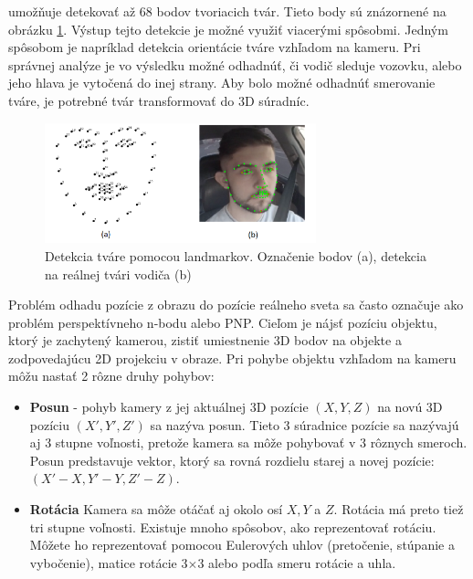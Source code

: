 \documentclass[slovak,master,dept460,male,cpp,cpdeclaration]{diploma}
\begin{document}
 umožňuje detekovať až 68 bodov tvoriacich tvár. Tieto body sú znázornené na obrázku \ref{fig:landmarks}. Výstup tejto detekcie je možné využiť viacerými spôsobmi. Jedným spôsobom je napríklad detekcia orientácie tváre vzhľadom na kameru. Pri správnej analýze je vo výsledku možné odhadnúť, či vodič sleduje vozovku, alebo jeho hlava je vytočená do inej strany. Aby bolo možné odhadnúť smerovanie tváre, je potrebné tvár transformovať do 3D súradníc.

\begin{figure}[H]
	\centering
	\includegraphics[width=0.7\textwidth]{Figures/landmarks.png}
	\caption{Detekcia tváre pomocou landmarkov. Označenie  bodov (a), detekcia na reálnej tvári vodiča (b)}
	\label{fig:landmarks}
\end{figure}


Problém odhadu pozície z obrazu do pozície reálneho sveta sa často označuje ako problém perspektívneho n-bodu alebo PNP. Cieľom je nájsť pozíciu objektu, ktorý je zachytený kamerou, zistiť umiestnenie  3D bodov na objekte a zodpovedajúcu 2D projekciu v obraze. Pri pohybe objektu vzhľadom na kameru môžu nastať 2 rôzne druhy pohybov:
\begin{itemize}
\item\textbf{Posun} - pohyb kamery z jej aktuálnej 3D pozície $(X, Y, Z)$ na novú 3D pozíciu $(X ', Y', Z ')$ sa nazýva posun. Tieto 3 súradnice pozície sa nazývajú aj 3 stupne voľnosti, pretože kamera sa môže pohybovať v 3 rôznych smeroch. Posun predstavuje vektor, ktorý sa rovná rozdielu starej a novej pozície:  $(X '- X, Y' - Y, Z '- Z)$.
\item\textbf{Rotácia}  Kamera sa môže otáčať aj okolo osí $X, Y$ a $Z$. Rotácia má preto tiež tri stupne voľnosti. Existuje mnoho spôsobov, ako reprezentovať rotáciu. Môžete ho reprezentovať pomocou Eulerových uhlov (pretočenie, stúpanie a vybočenie), matice rotácie 3$\times$3 alebo podľa smeru rotácie a uhla.
\end{itemize}
\end{document}
